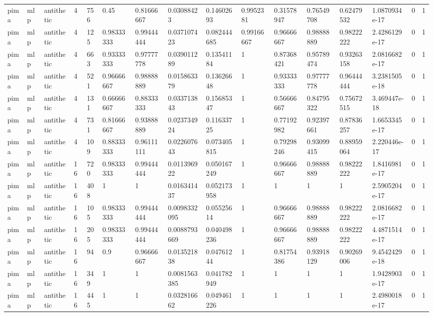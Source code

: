 \begin{tabular}{llllllllllllllll}
pima & mlp & antithetic & 4 & 756 & 0.45 & 0.81666667 & 0.03088423 & 0.14602693 & 0.9952381 & 0.31578947 & 0.76549708 & 0.62479532 & 1.0870934e-17 & 0 & 1 \\
pima & mlp & antithetic & 4 & 125 & 0.98333333 & 0.99444444 & 0.037107423 & 0.082444685 & 0.99166667 & 0.96666667 & 0.98888889 & 0.98222222 & 2.4286129e-17 & 0 & 1 \\
pima & mlp & antithetic & 4 & 663 & 0.93333333 & 0.97777778 & 0.039011289 & 0.13541184 & 1 & 0.87368421 & 0.95789474 & 0.93263158 & 2.0816682e-17 & 0 & 1 \\
pima & mlp & antithetic & 4 & 521 & 0.96666667 & 0.98888889 & 0.015863379 & 0.13626648 & 1 & 0.93333333 & 0.97777778 & 0.96444444 & 3.2381505e-18 & 0 & 1 \\
pima & mlp & antithetic & 4 & 131 & 0.66666667 & 0.88333333 & 0.033713843 & 0.15685347 & 1 & 0.56666667 & 0.84795322 & 0.75672515 & 3.469447e-18 & 0 & 1 \\
pima & mlp & antithetic & 4 & 731 & 0.81666667 & 0.93888889 & 0.023734924 & 0.11633725 & 1 & 0.77192982 & 0.92397661 & 0.87836257 & 1.6653345e-17 & 0 & 1 \\
pima & mlp & antithetic & 4 & 109 & 0.88333333 & 0.96111111 & 0.022607643 & 0.073405815 & 1 & 0.79298246 & 0.93099415 & 0.88959064 & 2.220446e-17 & 0 & 1 \\
pima & mlp & antithetic & 16 & 720 & 0.98333333 & 0.99444444 & 0.011396922 & 0.050167249 & 1 & 0.96666667 & 0.98888889 & 0.98222222 & 1.8416981e-17 & 0 & 1 \\
pima & mlp & antithetic & 16 & 408 & 1 & 1 & 0.016341437 & 0.052173958 & 1 & 1 & 1 & 1 & 2.5905204e-17 & 0 & 1 \\
pima & mlp & antithetic & 16 & 105 & 0.98333333 & 0.99444444 & 0.0098332095 & 0.05525614 & 1 & 0.96666667 & 0.98888889 & 0.98222222 & 2.0816682e-17 & 0 & 1 \\
pima & mlp & antithetic & 16 & 205 & 0.98333333 & 0.99444444 & 0.0088793669 & 0.040498236 & 1 & 0.96666667 & 0.98888889 & 0.98222222 & 4.4871514e-17 & 0 & 1 \\
pima & mlp & antithetic & 16 & 94 & 0.9 & 0.96666667 & 0.013521838 & 0.04761244 & 1 & 0.81754386 & 0.93918129 & 0.90269006 & 9.4542429e-18 & 0 & 1 \\
pima & mlp & antithetic & 16 & 349 & 1 & 1 & 0.0081563385 & 0.041782949 & 1 & 1 & 1 & 1 & 1.9428903e-17 & 0 & 1 \\
pima & mlp & antithetic & 16 & 445 & 1 & 1 & 0.032816662 & 0.049461226 & 1 & 1 & 1 & 1 & 2.4980018e-17 & 0 & 1 \\

\end{tabular}
